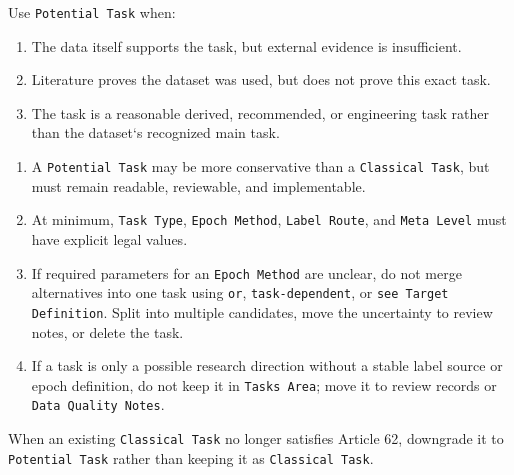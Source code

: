 \begin{tcolorbox}
\smallskip{}\par\smallskip

\noindent Use \texttt{Potential Task} when:\par\smallskip

\begin{enumerate}[leftmargin=1.5em,noitemsep,topsep=2pt]
\item The data itself supports the task, but external evidence is insufficient.
\item Literature proves the dataset was used, but does not prove this exact task.
\item The task is a reasonable derived, recommended, or engineering task rather than the dataset`s recognized main task.
\end{enumerate}

\smallskip{}\par\smallskip

\begin{enumerate}[leftmargin=1.5em,noitemsep,topsep=2pt]
\item A \texttt{Potential Task} may be more conservative than a \texttt{Classical Task}, but must remain readable, reviewable, and implementable.
\item At minimum, \texttt{Task Type}, \texttt{Epoch Method}, \texttt{Label Route}, and \texttt{Meta Level} must have explicit legal values.
\item If required parameters for an \texttt{Epoch Method} are unclear, do not merge alternatives into one task using \texttt{or}, \texttt{task-dependent}, or \texttt{see Target Definition}. Split into multiple candidates, move the uncertainty to review notes, or delete the task.
\item If a task is only a possible research direction without a stable label source or epoch definition, do not keep it in \texttt{Tasks Area}; move it to review records or \texttt{Data Quality Notes}.
\end{enumerate}

\smallskip{}\par\smallskip

\noindent When an existing \texttt{Classical Task} no longer satisfies Article 62, downgrade it to \texttt{Potential Task} rather than keeping it as \texttt{Classical Task}.\par\smallskip


\end{tcolorbox}
